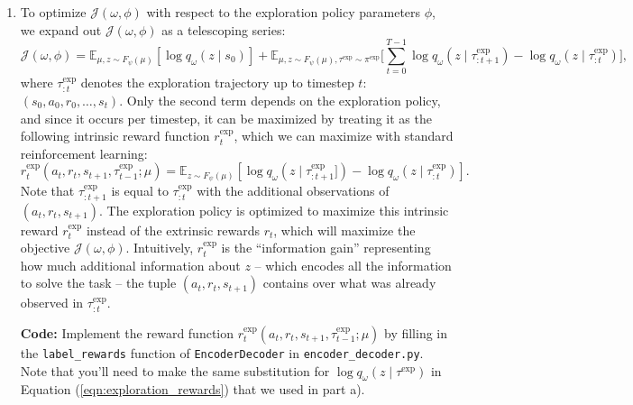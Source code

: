 \documentclass[12pt]{article}
\begin{document}
\begin{enumerate}[label=\alph*)]
    \item
        To optimize $\mathcal{J}(\omega, \phi)$ with respect to the exploration policy parameters $\phi$, we expand out $\mathcal{J}(\omega, \phi)$ as a telescoping series:
        \begin{equation*}
            \mathcal{J(\omega, \phi)} = \mathbb{E}_{\mu, z\sim F_{\psi}(\mu)}[\log q_{\omega}(z \mid s_0)] + \mathbb{E}_{\mu, z\sim F_{\psi}(\mu), \tau^\text{exp} \sim \pi^\text{exp}}\Big[\sum_{t=0}^{T - 1} \log q_{\omega}(z \mid \tau^\text{exp}_{:t + 1}) - \log q_{\omega}(z \mid \tau^\text{exp}_{:t})\Big],
        \end{equation*}
        where $\tau^\text{exp}_{:t}$ denotes the exploration trajectory up to timestep $t$: $(s_0, a_0, r_0, \ldots, s_t)$. Only the second term depends on the exploration policy, and since it occurs per timestep, it can be maximized by treating it as the following intrinsic reward function $r_t^\text{exp}$, which we can maximize with standard reinforcement learning:
        \begin{equation}\label{eqn:exploration_rewards}
            r_t^\text{exp}(a_t, r_t, s_{t+1}, \tau^\text{exp}_{t-1};\mu) = \mathbb{E}_{z\sim F_\psi(\mu)}\left[\log q_{\omega}(z \mid \tau^\text{exp}_{:t + 1}]) - \log q_{\omega}(z \mid \tau^\text{exp}_{:t})\right].
        \end{equation}
        Note that $\tau^\text{exp}_{:t + 1}$ is equal to $\tau^\text{exp}_{:t}$ with the additional observations of $(a_t, r_t, s_{t + 1})$.
        The exploration policy is optimized to maximize this intrinsic reward $r_t^\text{exp}$ instead of the extrinsic rewards $r_t$, which will maximize the objective $\mathcal{J}(\omega, \phi)$.
        Intuitively, $r_t^\text{exp}$ is the ``information gain'' representing how much additional information about $z$ -- which encodes all the information to solve the task -- the tuple $(a_t, r_t, s_{t + 1})$ contains over what was already observed in $\tau^\text{exp}_{:t}$.
        
        \textbf{Code: } Implement the reward function $r_t^\text{exp}(a_t, r_t, s_{t + 1}, \tau^\text{exp}_{t - 1}; \mu)$ by filling in the \texttt{label\_rewards} function of \texttt{EncoderDecoder} in \texttt{encoder\_decoder.py}.
        Note that you'll need to make the same substitution for $\log q_\omega(z \mid \tau^\text{exp})$ in Equation (\ref{eqn:exploration_rewards}) that we used in part a).
    

\end{enumerate}
\end{document}
